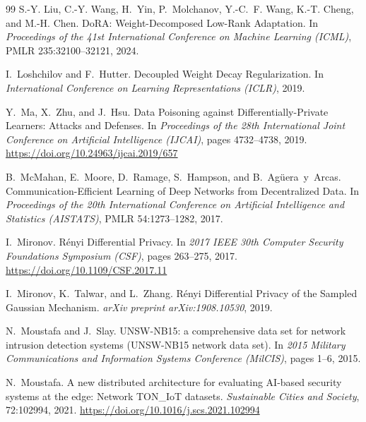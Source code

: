 \documentclass[11pt]{article}
\theoremstyle{plain}
\theoremstyle{definition}
\theoremstyle{remark}
\begin{document}
\begin{thebibliography}{99}
S.-Y. Liu, C.-Y. Wang, H.~Yin, P.~Molchanov, Y.-C.~F. Wang, K.-T. Cheng, and M.-H. Chen.
\newblock DoRA: Weight-Decomposed Low-Rank Adaptation.
\newblock In \emph{Proceedings of the 41st International Conference on Machine Learning (ICML)}, PMLR 235:32100--32121, 2024.

I.~Loshchilov and F.~Hutter.
\newblock Decoupled Weight Decay Regularization.
\newblock In \emph{International Conference on Learning Representations (ICLR)}, 2019.

Y.~Ma, X.~Zhu, and J.~Hsu.
\newblock Data Poisoning against Differentially-Private Learners: Attacks and Defenses.
\newblock In \emph{Proceedings of the 28th International Joint Conference on Artificial Intelligence (IJCAI)}, pages 4732--4738, 2019.
\newblock \url{https://doi.org/10.24963/ijcai.2019/657}

B.~McMahan, E.~Moore, D.~Ramage, S.~Hampson, and B.~Ag{\"u}era~y~Arcas.
\newblock Communication-Efficient Learning of Deep Networks from Decentralized Data.
\newblock In \emph{Proceedings of the 20th International Conference on Artificial Intelligence and Statistics (AISTATS)}, PMLR 54:1273--1282, 2017.

I.~Mironov.
\newblock R{\'e}nyi Differential Privacy.
\newblock In \emph{2017 IEEE 30th Computer Security Foundations Symposium (CSF)}, pages 263--275, 2017.
\newblock \url{https://doi.org/10.1109/CSF.2017.11}

I.~Mironov, K.~Talwar, and L.~Zhang.
\newblock R{\'e}nyi Differential Privacy of the Sampled Gaussian Mechanism.
\newblock \emph{arXiv preprint arXiv:1908.10530}, 2019.

N.~Moustafa and J.~Slay.
\newblock UNSW-NB15: a comprehensive data set for network intrusion detection systems (UNSW-NB15 network data set).
\newblock In \emph{2015 Military Communications and Information Systems Conference (MilCIS)}, pages 1--6, 2015.

N.~Moustafa.
\newblock A new distributed architecture for evaluating AI-based security systems at the edge: Network TON\_IoT datasets.
\newblock \emph{Sustainable Cities and Society}, 72:102994, 2021.
\newblock \url{https://doi.org/10.1016/j.scs.2021.102994}


\end{thebibliography}
\end{document}
